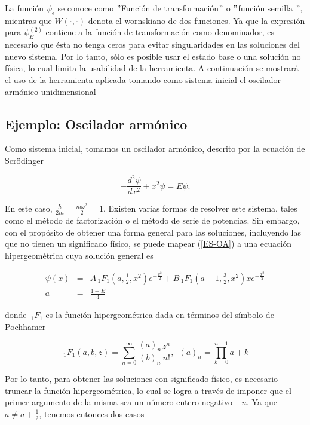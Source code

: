 La función $\psi_\epsilon$ se conoce como $"$Función de transformación$"$ o $"$función semilla $"$, mientras que $W(\cdot,\cdot)$ denota el wornskiano de dos funciones. Ya que la expresión para $\psi_E^{(2)}$ contiene a la función de transformación como denominador, es necesario que ésta no tenga ceros para evitar singularidades en las soluciones del nuevo sistema. Por lo tanto, sólo es posible usar el estado base o una solución no física, lo cual limita la usabilidad de la herramienta. A continuación se mostrará el uso de la herramienta aplicada tomando como sistema inicial el oscilador armónico unidimensional

\subsection{Ejemplo: Oscilador armónico}

Como sistema inicial, tomamos un oscilador armónico, descrito por la ecuación de Scrödinger

\begin{equation}
- \frac{d^2 \psi}{dx^2} + x^2 \psi = E\psi. \label{ES-OA}
\end{equation}

En este caso, $\frac{\hbar}{2m} = \frac{m\omega^2}{2} = 1$. Existen varias formas de resolver este sistema, tales como el método de factorización o el método de serie de potencias. Sin embargo, con el propósito de obtener una forma general para las soluciones, incluyendo las que no tienen un significado físico, se puede mapear (\ref{ES-OA}) a una ecuación hipergeométrica cuya solución general es

\begin{eqnarray*}
	\psi(x) &=& A \,_1 F_1 \left(a, \frac{1}{2},x^2 \right) e^{-\frac{x^2}{2}} +  B \,_1 F_1 \left(a + 1, \frac{3}{2}, x^2 \right) x e^{-\frac{x^2}{2}}
	\\
	a &=& \frac{1-E}{4}
\end{eqnarray*}

donde $\,_1 F_1$ es la función hipergeométrica dada en términos del símbolo de Pochhamer

\begin{equation*}
\,_1 F_1 \left(a,b,z\right) = \sum^\infty_{n=0}{\frac{(a)_n}{(b)_n} \frac{z^n}{n!}}, \,\,\, (a)_n = \prod_{k=0}^{n-1}{a+k}	
\end{equation*}


Por lo tanto, para obtener las soluciones con significado físico, es necesario truncar la función hipergeométrica, lo cual se logra a través de imponer que el primer argumento de la misma sea un número entero negativo $-n$. Ya que $a \ne a+\frac{1}{2}$, tenemos entonces dos casos

